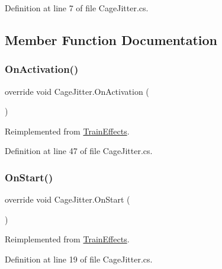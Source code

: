 Definition at line 7 of file Cage\+Jitter.\+cs.



\subsection{Member Function Documentation}
\mbox{\label{class_cage_jitter_a31ae5a4505b942993f98a0141da454c2}} 
\subsubsection{\texorpdfstring{On\+Activation()}{OnActivation()}}
{\footnotesize\ttfamily override void Cage\+Jitter.\+On\+Activation (\begin{DoxyParamCaption}{ }\end{DoxyParamCaption})\hspace{0.3cm}{\ttfamily [virtual]}}



Reimplemented from \mbox{\hyperlink{class_train_effects_ad77aba799a5d19a141128639a4bebcad}{Train\+Effects}}.



Definition at line 47 of file Cage\+Jitter.\+cs.

\mbox{\label{class_cage_jitter_a5a4fcbd00fcb23ded787b25ad55ef56c}} 
\subsubsection{\texorpdfstring{On\+Start()}{OnStart()}}
{\footnotesize\ttfamily override void Cage\+Jitter.\+On\+Start (\begin{DoxyParamCaption}{ }\end{DoxyParamCaption})\hspace{0.3cm}{\ttfamily [virtual]}}



Reimplemented from \mbox{\hyperlink{class_train_effects_acabdc668bc9a6cf6d8d9e06fa5ccb071}{Train\+Effects}}.



Definition at line 19 of file Cage\+Jitter.\+cs.

\mbox{\label{class_cage_jitter_a0e84c06f7b50189264d001f5317fc50e}} 

